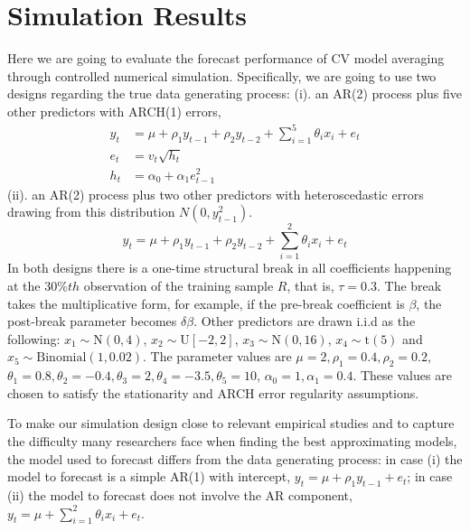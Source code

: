 \section{Simulation Results}
Here we are going to evaluate the forecast performance of CV model averaging through controlled numerical simulation. Specifically, we are going to use two designs regarding the true data generating process: (i). an AR(2) process plus five other predictors with ARCH(1) errors, 
\begin{subequations}
            \begin{align}
                y_{t} & = \mu + \rho_{1}y_{t-1} + \rho_{2}y_{t-2} + \sum_{i=1}^{5}\theta_{i}x_{i} + e_{t} \\
                e_{t} & = v_{t}\sqrt{h_{t}}\\
                h_{t} & = \alpha_{0} + \alpha_{1}e_{t-1}^2
            \end{align}
\end{subequations}
(ii). an AR(2) process plus two other predictors with heteroscedastic errors drawing from this distribution $N(0,y_{t-1}^2)$. 
\begin{equation}
                y_{t} = \mu + \rho_{1}y_{t-1} + \rho_{2}y_{t-2} + \sum_{i=1}^{2}\theta_{i}x_{i} + e_{t}
\end{equation}
In both designs there is a one-time structural break in all coefficients happening at the $30\%th$ observation of the training sample $R$, that is, $\tau = 0.3$. The break takes the multiplicative form, for example, if the pre-break coefficient is $\beta$, the post-break parameter becomes $\delta\beta$. Other predictors are drawn i.i.d as the following: $x_{1} \sim \mathrm{N}(0,4)$, $x_{2} \sim \mathrm{U}[-2,2]$, $x_{3} \sim \mathrm{N}(0,16)$, $x_{4} \sim \mathrm{t}(5)$ and $x_{5} \sim \mathrm{Binomial}(1,0.02)$. The parameter values are $\mu = 2, \rho_{1} = 0.4, \rho_{2} = 0.2$, $\theta_{1} = 0.8,\theta_{2} = -0.4,\theta_{3} = 2,\theta_{4} = -3.5,\theta_{5} = 10$, $\alpha_{0} = 1, \alpha_{1} = 0.4$. These values are chosen to satisfy the stationarity and ARCH error regularity assumptions.

To make our simulation design close to relevant empirical studies and to capture the difficulty many researchers face when finding the best approximating models, the model used to forecast differs from the data generating process: in case (i) the model to forecast is a simple AR(1) with intercept, $y_{t} = \mu + \rho_{1}y_{t-1} + e_{t}$; in case (ii) the model to forecast does not involve the AR component, $y_{t} = \mu + \sum_{i=1}^{2}\theta_{i}x_{i} + e_{t}$.


